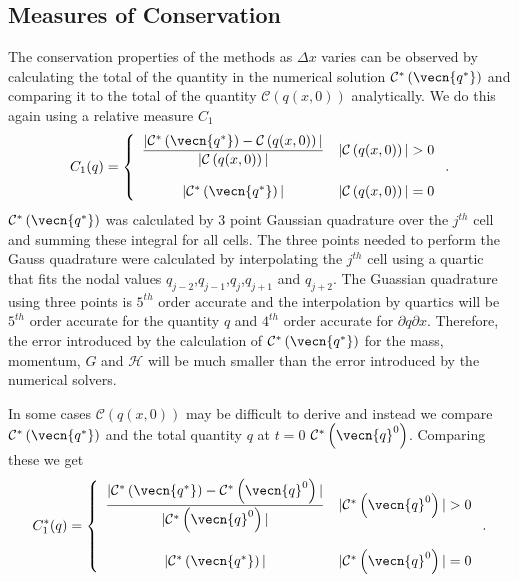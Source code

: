 \subsection{Measures of Conservation}
The conservation properties of the methods as $\Delta x$ varies can be observed by calculating the total of the quantity in the numerical solution $\mathcal{C}^*\left({\vecn{q^*}}\right)$ and comparing it to the total of the quantity $\mathcal{C}\left({q(x,0)} \right)$ analytically. We do this again using a relative measure $C_1$ 
\begin{equation}
C_1(q) =  \left\lbrace \begin{array}{c r} 
\dfrac{|\mathcal{C}^*\left({\vecn{q^*}}\right) - \mathcal{C}\left({q(x,0)} \right)| }{|\mathcal{C}\left({q(x,0)} \right)|} & |\mathcal{C}\left({q(x,0)} \right)| > 0 \\ \\
|\mathcal{C}^*\left({\vecn{q^*}}\right)| & |\mathcal{C}\left({q(x,0)} \right)| = 0  \end{array}\right. . 
\label{eqn:C1qdef} 
\end{equation}
$\mathcal{C}^*\left({\vecn{q^*}}\right)$ was calculated by 3 point Gaussian quadrature over the $j^{th}$ cell and summing these integral for all cells. The three points needed to perform the Gauss quadrature were calculated by interpolating the $j^{th}$ cell using a quartic that fits the nodal values $q_{j-2}$,$q_{j-1}$,$q_{j}$,$q_{j+1}$ and $q_{j+2}$. The Guassian quadrature using three points is $5^{th}$ order accurate and the interpolation by quartics will be $5^{th}$ order accurate for the quantity $q$ and $4^{th}$ order accurate for $\partial q \partial x$. Therefore, the error introduced by the calculation of $\mathcal{C}^*\left({\vecn{q^*}}\right)$ for the mass, momentum, $G$ and $\mathcal{H}$ will be much smaller than the error introduced by the numerical solvers.

In some cases $\mathcal{C}\left({q(x,0)} \right)$ may be difficult to derive and instead we compare $\mathcal{C}^*\left({\vecn{q^*}}\right)$ and the total quantity $q$ at $t=0$ $\mathcal{C}^*\left({\vecn{q}^0}\right)$. Comparing these we get 
\begin{equation}
C^*_1(q) =  \left\lbrace \begin{array}{c r} 
\dfrac{|\mathcal{C}^*\left({\vecn{q^*}}\right) - \mathcal{C}^*\left({\vecn{q}^0}\right)| }{|\mathcal{C}^*\left({\vecn{q}^0}\right)|} & |\mathcal{C}^*\left({\vecn{q}^0}\right)| > 0 \\ \\
|\mathcal{C}^*\left({\vecn{q^*}}\right)| & |\mathcal{C}^*\left({\vecn{q}^0}\right)| = 0  \end{array}\right. . 
\label{eqn:C*1qdef} 
\end{equation}


